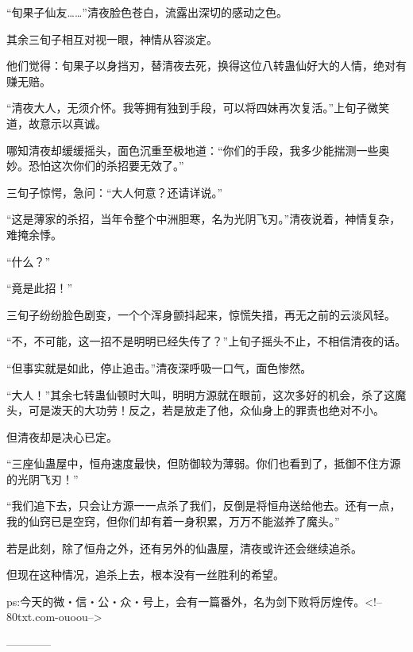 \begin{this_body}
“旬果子仙友……”清夜脸色苍白，流露出深切的感动之色。

其余三旬子相互对视一眼，神情从容淡定。

他们觉得：旬果子以身挡刃，替清夜去死，换得这位八转蛊仙好大的人情，绝对有赚无赔。

“清夜大人，无须介怀。我等拥有独到手段，可以将四妹再次复活。”上旬子微笑道，故意示以真诚。

哪知清夜却缓缓摇头，面色沉重至极地道：“你们的手段，我多少能揣测一些奥妙。恐怕这次你们的杀招要无效了。”

三旬子惊愕，急问：“大人何意？还请详说。”

“这是薄家的杀招，当年令整个中洲胆寒，名为光阴飞刃。”清夜说着，神情复杂，难掩余悸。

“什么？”

“竟是此招！”

三旬子纷纷脸色剧变，一个个浑身颤抖起来，惊慌失措，再无之前的云淡风轻。

“不，不可能，这一招不是明明已经失传了？”上旬子摇头不止，不相信清夜的话。

“但事实就是如此，停止追击。”清夜深呼吸一口气，面色惨然。

“大人！”其余七转蛊仙顿时大叫，明明方源就在眼前，这次多好的机会，杀了这魔头，可是泼天的大功劳！反之，若是放走了他，众仙身上的罪责也绝对不小。

但清夜却是决心已定。

“三座仙蛊屋中，恒舟速度最快，但防御较为薄弱。你们也看到了，抵御不住方源的光阴飞刃！”

“我们追下去，只会让方源一一点杀了我们，反倒是将恒舟送给他去。还有一点，我的仙窍已是空窍，但你们却有着一身积累，万万不能滋养了魔头。”

若是此刻，除了恒舟之外，还有另外的仙蛊屋，清夜或许还会继续追杀。

但现在这种情况，追杀上去，根本没有一丝胜利的希望。

ps:今天的微・信・公・众・号上，会有一篇番外，名为剑下败将厉煌传。<!--80txt.com-ouoou-->

------------

\end{this_body}

